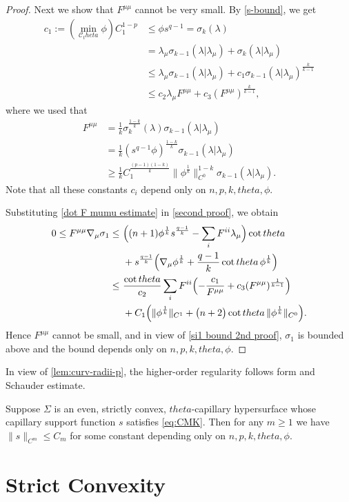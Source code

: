 \documentclass[12pt]{amsart}
\def\theta{theta}%
\numberwithin{equation}{section}
\newcommand{\8}{\infty}
\newcommand{\la}{\lambda}
\newcommand{\si}{\sigma}
\newcommand{\cC}{\mathcal{C}}
\newcommand{\eq}[1]{\begin{equation}\begin{alignedat}{2}#1\end{alignedat}\end{equation}}
\newcommand{\Cth}{\cC_\theta}
\begin{document}
\begin{proof}
Next we show that $F^{\mu\mu}$ cannot be very small. By \eqref{s-bound}, we get
\eq{\label{dot F mumu estimate}
c_1:=(\min_{\Cth} \phi ) C_1^{1-p}&\leq \phi s^{q-1}=\si_k(\la)\\
&=\la_\mu \si_{k-1}(\la|\la_\mu)+\si_k(\la|\la_\mu)\\
                     &\leq \la_\mu \si_{k-1}(\la|\la_\mu)+c_1\si_{k-1}(\la|\la_\mu)^\frac{k}{k-1}\\
                     &\leq c_2 \la_{\mu}F^{\mu\mu}+c_3 (F^{\mu\mu})^{\frac{k}{k-1}},
}
where we used that
\eq{
F^{\mu\mu}&=\frac{1}{k}\si_k^\frac{1-k}{k}(\la)\si_{k-1}(\la|\la_\mu)\\
&=\frac{1}{k} (s^{q-1}\phi)^\frac{1-k}{k}\si_{k-1}(\la|\la_\mu)\\
&\geq \frac{1}{k} C_1^{\frac{(p-1)(1-k)}{k}}\|\phi^\frac{1}{k}\|_{C^0}^{1-k}\si_{k-1}(\la|\la_\mu).
}
Note that all these constants $c_i$ depend only on $n,p,k,\theta,\phi$. 

Substituting \eqref{dot F mumu estimate} in \eqref{second proof}, we obtain
\eq{
0\leq F^{\mu\mu}\nabla_{\mu}\sigma_1 \leq &~\Bigl((n+1)\phi^\frac{1}{k}s^\frac{q-1}{k}-\sum _{i}F^{ii}\la_{\mu}\Bigr)\cot \theta \\
&~+s^\frac{q-1}{k}\Bigl(\nabla_{\mu}\phi^{\frac{1}{k}}+\frac{q-1}{k}\cot\theta\, \phi^{\frac{1}{k}}\Bigr)\\
\leq &~\frac{\cot\theta}{c_2}\sum_{i}F^{ii}\Bigl(-\frac{c_1}{F^{\mu\mu}}+c_3(F^{\mu\mu})^{\frac{1}{k-1}}\Bigr)\\
&~+C_1\Bigl(\|\phi^{\frac{1}{k}}\|_{C^1}+\big(n+2\big)\cot\theta\, \|\phi^{\frac{1}{k}}\|_{C^0}\Bigr).
}
Hence $F^{\mu\mu}$ cannot be small, and in view of \eqref{si1 bound 2nd proof}, $\sigma_1$ is bounded above and the bound depends only on $n,p,k,\theta,\phi$.
\end{proof}

In view of \autoref{lem:curv-radii-p}, the higher-order regularity follows form \cite{LT86} and Schauder estimate.
\begin{prop}\label{prop:regularity}
Suppose $\Sigma$ is an even, strictly convex, $\theta$-capillary hypersurface whose capillary support function $s$ satisfies \eqref{eq:CMK}. 
Then for any $m\geq 1$ we have $\|s\|_{C^m} \leq C_m$ for some constant depending only on $n,p,k,\theta,\phi$.  
\end{prop}

\section{Strict Convexity}\label{sec:strict-convexity}
\end{document}
